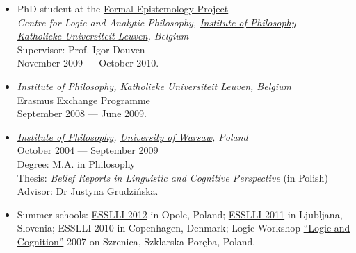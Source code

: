 \documentclass[a4paper,12pt]{article}
\begin{document}
\begin{small}
\begin{itemize}
  \item PhD student at the  \href{http://formalphilosophy.org/}{Formal Epistemology Project}\\
    \emph{Centre for Logic and Analytic Philosophy, \href{http://hiw.kuleuven.be/eng/}{Institute of Philosophy}\\
      \href{http://www.kuleuven.be/english}{Katholieke Universiteit Leuven}, Belgium}\\
    Supervisor: Prof. Igor Douven\\
    November 2009 --- October 2010.

  \end{itemize}



  
  \begin{itemize}
  \item \emph{\href{http://hiw.kuleuven.be/eng/}{Institute of Philosophy}, \href{http://www.kuleuven.be}{Katholieke Universiteit Leuven}, Belgium}\\
    Erasmus Exchange Programme\\
    September 2008 --- June 2009.
    
  \item \emph{\href{http://www.filozofia.uw.edu.pl}{Institute of
        Philosophy}, \href{http://www.uw.edu.pl}{University of Warsaw}, Poland}\\
    October 2004 --- September 2009\\
    Degree: M.A. in Philosophy\\
    Thesis: \emph{Belief Reports in Linguistic and Cognitive
      Perspective} (in Polish)\\
    Advisor: Dr Justyna Grudzińska.
    


  \item Summer schools: %
    \href{http://www.esslli2012.pl}{ESSLLI 2012} in Opole, Poland;
    \href{http://esslli2011.ijs.si}{ESSLLI 2011} in Ljubljana,
    Slovenia;
    ESSLLI 2010 in Copenhagen, Denmark;
    Logic Workshop
    \href{http://www.logika.uw.edu.pl/warsztaty2007/index.html}{``Logic
      and Cognition''} 2007 on Szrenica, Szklarska Poręba, Poland.


\end{itemize}
\end{small}
\end{document}
